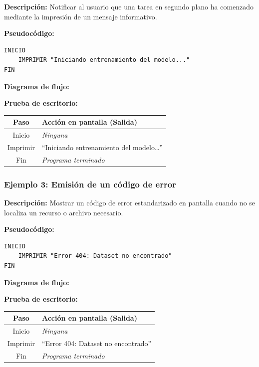 \textbf{Descripción:} Notificar al usuario que una tarea en segundo
plano ha comenzado mediante la impresión de un mensaje informativo.

\textbf{Pseudocódigo:}

\begin{verbatim}
INICIO
    IMPRIMIR "Iniciando entrenamiento del modelo..."
FIN
\end{verbatim}

\textbf{Diagrama de flujo:}



\textbf{Prueba de escritorio:}

{\def\LTcaptype{none} %
\begin{longtable}[]{@{}cl@{}}
\toprule\noalign{}
Paso & Acción en pantalla (Salida) \\
\midrule\noalign{}
\endhead
\bottomrule\noalign{}
\endlastfoot
Inicio & \emph{Ninguna} \\
Imprimir & ``Iniciando entrenamiento del modelo\ldots{}'' \\
Fin & \emph{Programa terminado} \\
\end{longtable}
}

\subsubsection{Ejemplo 3: Emisión de un código de
error}\label{ejemplo-3-emisiuxf3n-de-un-cuxf3digo-de-error}

\textbf{Descripción:} Mostrar un código de error estandarizado en
pantalla cuando no se localiza un recurso o archivo necesario.

\textbf{Pseudocódigo:}

\begin{verbatim}
INICIO
    IMPRIMIR "Error 404: Dataset no encontrado"
FIN
\end{verbatim}

\textbf{Diagrama de flujo:}



\textbf{Prueba de escritorio:}

{\def\LTcaptype{none} %
\begin{longtable}[]{@{}cl@{}}
\toprule\noalign{}
Paso & Acción en pantalla (Salida) \\
\midrule\noalign{}
\endhead
\bottomrule\noalign{}
\endlastfoot
Inicio & \emph{Ninguna} \\
Imprimir & ``Error 404: Dataset no encontrado'' \\
Fin & \emph{Programa terminado} \\
\end{longtable}
}

